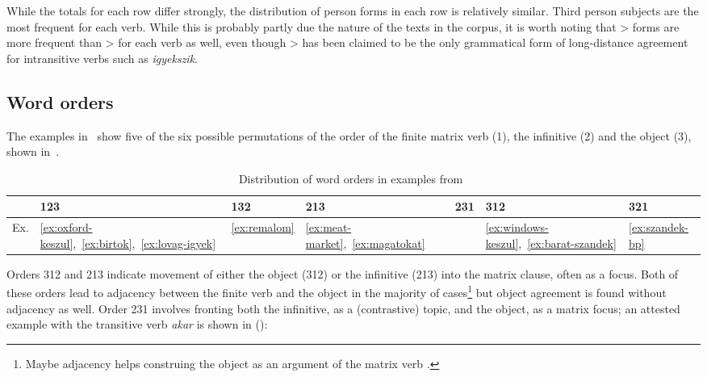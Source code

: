 While the totals for each row differ strongly, the distribution of person forms
in each row is relatively similar. Third person subjects are the most frequent
for each verb. While this is probably partly due the nature of the texts in the
corpus, it is worth noting that \Fpl>\Third{} forms are more frequent than
\Fsg{}>\Second{} for each verb as well, even though \Fsg>\Second{} has been
claimed to be the only grammatical form of long-distance agreement for
intransitive verbs such as \emph{igyekszik}.

\subsection{Word orders}\label{sub:word-orders}

The examples in~ show five of the six possible permutations of
the order of the finite matrix verb (1), the infinitive (2) and the object (3),
shown in~.

\begin{table}[htpb]
    \centering
    \begin{tabularx}{1\textwidth}{lXXXXXX}
    \toprule
        & 123 & 132 & 213 & 231 & 312 & 321 \\
    \midrule
    Ex. & \eqref{ex:oxford-keszul},~\eqref{ex:birtok},~\eqref{ex:lovag-igyek} &
                \eqref{ex:remalom} &
                    \eqref{ex:meat-market},~\eqref{ex:magatokat} &
                        &
                            \eqref{ex:windows-keszul},~\eqref{ex:barat-szandek} &
                                \eqref{ex:szandek-bp} \\
    \bottomrule
    \end{tabularx}
    \caption{Distribution of word orders in examples
    from~}\label{tb:data-orders}
\end{table}

Orders 312 and 213 indicate movement of either the object (312) or the
infinitive (213) into the matrix clause, often as a focus. Both of these orders
lead to adjacency between the finite verb and the object in the majority of
cases\footnote{Maybe adjacency helps construing the object as an argument of
the matrix verb \parencite{Peredy2009}.} but object agreement is found without
adjacency as well. Order 231 involves fronting both the infinitive, as a
(contrastive) topic, and the object, as a matrix focus; an attested example
with the transitive verb \emph{akar} is shown in (\nextx):

